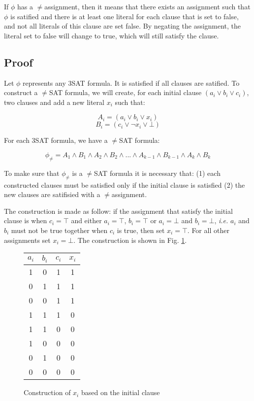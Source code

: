 \documentclass[letterpaper]{article}
\begin{document}
If $\phi$ has a $\not=$assignment, then it means that there exists an
assignment such that $\phi$ is satified and there is at least one
literal for each clause that is set to false, and not all literals
of this clause are set false. By negating the assignment, the literal
set to false will change to true, which will still satisfy the clause.


\subsection{Proof}

Let $\phi$ represents any 3SAT formula. It
is satisfied if all clauses are satified. To construct a
$\not=$SAT formula, we will create, for each initial clause
$(a_i \vee b_i \vee c_i)$,
two clauses
and add a new literal $x_i$ such that:

$$
A_{i} = (a_i \vee b_i \vee x_i)
$$
$$
B_{i} = (c_i \vee \neg x_i \vee \bot)
$$

For each 3SAT formula, we have a $\not=$SAT formula:

$$
\phi_{\not=} = A_1 \wedge B_1 \wedge A_2 \wedge B_2 \wedge ...
\wedge A_{k-1} \wedge B_{k-1} \wedge A_k \wedge B_k
$$

To make sure that $\phi_{\not=}$ is a $\not=$SAT formula it is
necessary that: (1)
each constructed clauses
must be satisfied only if the initial clause is satisfied
(2) the new clauses are satifisied with a $\not=$assignment.

The construction is made as follow: if the assignment that satisfy the
initial clause is when $c_i = \top$ and either $a_i = \top$, $b_i = \top$ or
$a_i = \bot$ and $b_i = \bot$, \textit{i.e.}
$a_i$ and $b_i$ must not be true together when
$c_i$ is true,
then set $x_i = \top$. For all other assignments set $x_i = \bot$.
The construction is shown in Fig. \ref{tab:assignments}.

\begin{figure}[H]
    \centering
    \begin{tabular}{|c|c|c||c|}
        \hline
        $a_i$ & $b_i$ & $c_i$ & $x_i$ \\
        \hline
        \hline
        1 & 0 & 1 & 1 \\
        \hline
        0 & 1 & 1 & 1 \\
        \hline
        0 & 0 & 1 & 1 \\
        \hline
        1 & 1 & 1 & 0 \\
        \hline
        1 & 1 & 0 & 0 \\
        \hline
        1 & 0 & 0 & 0 \\
        \hline
        0 & 1 & 0 & 0 \\
        \hline
        0 & 0 & 0 & 0 \\
        \hline
    \end{tabular}

    \caption{Construction of $x_i$ based on the initial clause}
    \label{tab:assignments}
\end{figure}
\end{document}
